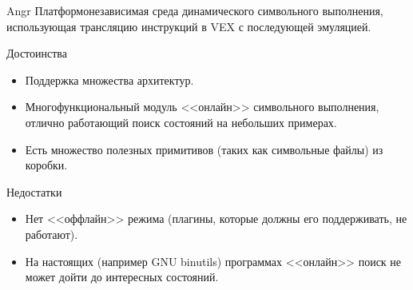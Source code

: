 \documentclass[10pt]{beamer}
\begin{document}

\begin{frame}{Angr}
    Платформонезависимая среда динамического символьного выполнения, использующая трансляцию инструкций в VEX с последующей эмуляцией.
    \begin{block}{Достоинства}
      \begin{itemize}
        \item Поддержка множества архитектур.
        \item Многофункциональный модуль <<онлайн>> символьного выполнения, отлично работающий поиск состояний на небольших примерах.
        \item Есть множество полезных примитивов (таких как символьные файлы) из коробки.
      \end{itemize}
    \end{block}
        \begin{block}{Недостатки}
          \begin{itemize}
      \item Нет <<оффлайн>> режима (плагины, которые должны его поддерживать, не работают).
      \item На настоящих (например GNU binutils) программах <<онлайн>> поиск не может дойти до интересных состояний.
      \end{itemize}
    \end{block}
\end{frame}
\end{document}
